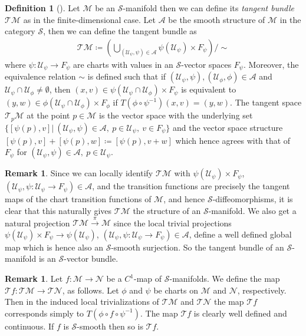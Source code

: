 \documentclass[12pt,a4paper]{article}
\theoremstyle{plain}
\theoremstyle{definition}
\newtheorem{definition}[theorem]{Definition}
\newtheorem{remark}[theorem]{Remark}
\newcommand{\Mcal}{\mathcal{M}}
\newcommand{\Ncal}{\mathcal{N}}
\newcommand{\Scal}{\mathcal{S}}
\newcommand{\TMcal}{\mathcal{TM}}
\newcommand{\Ucal}{\mathcal{U}}
\begin{document}
\begin{definition}[{\cite[Definition II.3.3]{InfDimLieneeb}}]
Let $\Mcal$ be an $\Scal$-manifold then we can define its \textit{tangent bundle} $\mathcal{TM}$ as in the finite-dimensional case.
Let $\mathcal{A}$ be the smooth structure of $\Mcal$ in the category $\Scal$, then we can define the tangent bundle as
\begin{align*}
    \mathcal{TM}\coloneqq \left(\bigcup_{(\Ucal_\psi,\psi)\in \mathcal A} \psi(\Ucal_\psi)\times F_\psi\right) \bigg/\sim
\end{align*}
where $\psi:\Ucal_\psi\to F_\psi$ are charts with values in an $\Scal$-vector spaces $F_\psi$. 
Moreover, the equivalence relation $\sim$ is defined such that if $(\Ucal_\psi,\psi),(\Ucal_\phi,\phi)\in \mathcal A$ and $\Ucal_\psi \cap \Ucal_\phi\neq \emptyset$, then $(x,v)\in \psi(\Ucal_\psi\cap \Ucal_\phi)\times F_\psi$ is equivalent to $(y,w)\in \phi(\Ucal_\psi\cap\Ucal_\phi)\times F_\phi$ if $T(\phi\circ\psi^{-1})(x,v)=(y,w)$. The tangent space $\mathcal{T}_p\Mcal$ at the point $p\in \Mcal$ is the vector space with the underlying set $\{[\psi(p),v]|~(\Ucal_\psi,\psi)\in \mathcal A,\ p\in \Ucal_\psi,\ v\in F_\psi\}$ and the vector space structure $[\psi(p),v]+[\psi(p),w]\coloneqq [\psi(p),v+w]$ which hence agrees with that of $F_\psi$ for $(\Ucal_\psi,\psi)\in \mathcal A,\ p\in \Ucal_\psi$.
\end{definition}

\begin{remark}
Since we can locally identify $\mathcal{TM}$ with $\psi(\Ucal_\psi)\times F_\psi$,
$(\Ucal_\psi, \psi:\Ucal_\psi\to F_\psi)\in \mathcal A$, and the transition functions are precisely the tangent maps of the chart transition functions of $\Mcal$, and hence $\Scal$-diffeomorphisms, it is clear that this naturally gives $\mathcal{TM}$ the structure of an $\Scal$-manifold. We also get a natural projection $\mathcal{TM}\xrightarrow{\pi}\Mcal$ since the local trivial projections $\psi(\Ucal_\psi)\times F_\psi\to \psi(\Ucal_\psi)$,
$(\Ucal_\psi, \psi:\Ucal_\psi\to F_\psi)\in \mathcal A$, define a well defined global map which is hence also an $\Scal$-smooth surjection. So the tangent bundle of an $\Scal$-manifold is an $\Scal$-vector bundle.
\end{remark} 



\begin{remark}
\label{Rem:TangentMapManifolds}
Let $f:\Mcal\to \Ncal$ be a $C^1$-map of $\Scal$-manifolds. We define the map $\mathcal Tf:\mathcal{TM}\to \mathcal{TN}$, as follows. Let $\phi$ and $\psi$ be charts on $\Mcal$ and $\Ncal$, respectively. Then in the induced local trivializations of $\TMcal$ and $\mathcal{TN}$ the map $\mathcal{T}f$ corresponds simply to $T(\phi\circ f\circ \psi^{-1})$. The map $\mathcal Tf$ is clearly well defined and continuous. If $f$ is $\Scal$-smooth then so is $\mathcal{T}f$.
\end{remark}
\end{document}
